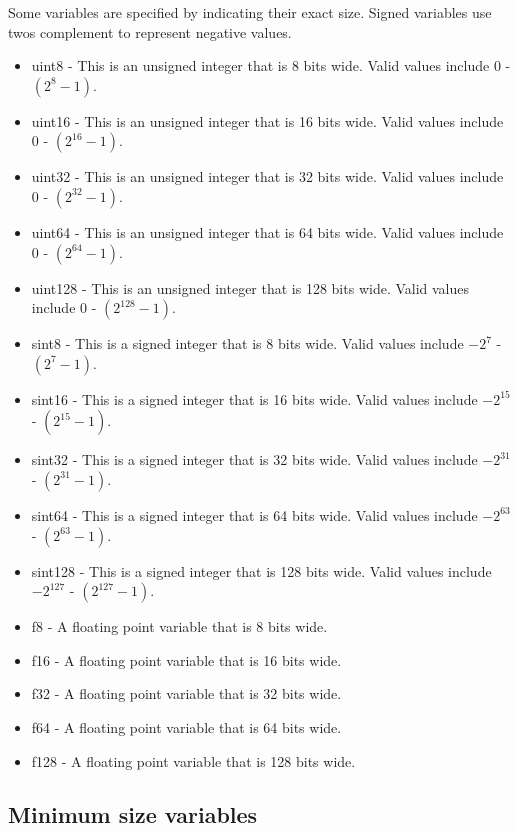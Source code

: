 \documentclass[12pt]{article}
\begin{document}
Some variables are specified by indicating their exact size. Signed variables use twos complement to represent negative values.
\begin{itemize}
\item uint8 - This is an unsigned integer that is 8 bits wide. Valid values include 0 - $(2^8 - 1)$.
\item uint16 - This is an unsigned integer that is 16 bits wide. Valid values include 0 - $(2^{16} - 1)$.
\item uint32 - This is an unsigned integer that is 32 bits wide. Valid values include 0 - $(2^{32} - 1)$.
\item uint64 - This is an unsigned integer that is 64 bits wide. Valid values include 0 - $(2^{64} - 1)$.
\item uint128 - This is an unsigned integer that is 128 bits wide. Valid values include 0 - $(2^{128} - 1)$.

\item sint8 - This is a signed integer that is 8 bits wide. Valid values include $-2^7$ - $(2^7 - 1)$.
\item sint16 - This is a signed integer that is 16 bits wide. Valid values include $-2^{15}$ - $(2^{15} - 1)$.
\item sint32 - This is a signed integer that is 32 bits wide. Valid values include $-2^{31}$ - $(2^{31} - 1)$.
\item sint64 - This is a signed integer that is 64 bits wide. Valid values include $-2^{63}$ - $(2^{63} - 1)$.
\item sint128 - This is a signed integer that is 128 bits wide. Valid values include $-2^{127}$ - $(2^{127} - 1)$.

\item f8 - A floating point variable that is 8 bits wide.
\item f16 - A floating point variable that is 16 bits wide.
\item f32 - A floating point variable that is 32 bits wide.
\item f64 - A floating point variable that is 64 bits wide.
\item f128 - A floating point variable that is 128 bits wide.

\end{itemize}

\subsection{Minimum size variables}
\end{document}
